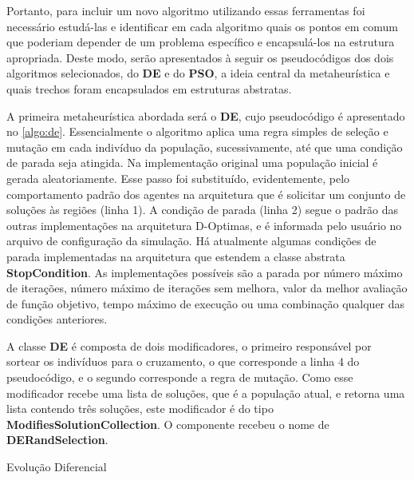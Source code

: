 Portanto, para incluir um novo algoritmo utilizando essas ferramentas foi necessário estudá-las e identificar em cada algoritmo quais os pontos em comum que poderiam depender de um problema específico e encapsulá-los na estrutura apropriada. Deste modo, serão apresentados à seguir os pseudocódigos dos dois algoritmos selecionados, do \textbf{DE} e do \textbf{PSO}, a ideia central da metaheurística e quais trechos foram encapsulados em estruturas abstratas.

A primeira metaheurística abordada será o \textbf{DE}, cujo pseudocódigo é apresentado no \autoref{algo:de}. Essencialmente o algoritmo aplica uma regra simples de seleção e mutação em cada indivíduo da população, sucessivamente, até que uma condição de parada seja atingida. Na implementação original uma população inicial é gerada aleatoriamente. Esse passo foi substituído, evidentemente, pelo comportamento padrão dos agentes na arquitetura que é solicitar um conjunto de soluções às regiões (linha 1). A condição de parada (linha 2) segue o padrão das outras implementações na arquitetura D-Optimas, e é informada pelo usuário no arquivo de configuração da simulação. Há atualmente algumas condições de parada implementadas na arquitetura que estendem a classe abstrata \textbf{StopCondition}. As implementações possíveis são a parada por número máximo de iterações, número máximo de iterações sem melhora, valor da melhor avaliação de função objetivo, tempo máximo de execução ou uma combinação qualquer das condições anteriores. 

A classe \textbf{DE} é composta de dois modificadores, o primeiro responsável por sortear os indivíduos para o cruzamento, o que corresponde a linha 4 do pseudocódigo, e o segundo corresponde a regra de mutação. Como esse modificador recebe uma lista de soluções, que é a população atual, e retorna uma lista contendo três soluções, este modificador é do tipo \textbf{ModifiesSolutionCollection}. O componente recebeu o nome de \textbf{DERandSelection}. 

\begin{algorithm}[H]
\caption{Evolução Diferencial}
\label{algo:de}
\begin{algorithmic}[1]
    \State {} 
                \Else
                \EndIf
            \EndFor
        \EndFor
        
            \Else
            \EndIf
        \EndFor
    \EndWhile
\end{algorithmic}
\end{algorithm}

